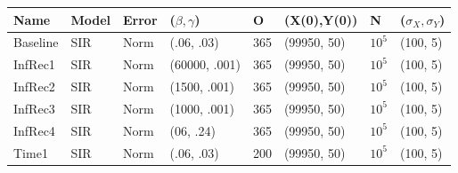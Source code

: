 \documentclass[12pt]{article}
\begin{document}
\begin{table}[]
\centering
\begin{tabular}{@{}llllllll@{}}
\toprule
\textbf{Name} & \textbf{Model} & \textbf{Error} & \textbf{($\beta, \gamma$)} & \textbf{O} & \textbf{(X(0),Y(0))} & \textbf{N} & \textbf{($\sigma_X, \sigma_Y$)} \\ \midrule
  Baseline        & SIR      &   Norm             & (.06, .03)                          &     365       &  (99950, 50)                    &  $10^5$          &(100, 5)                                \\ \midrule
  InfRec1       & SIR      &   Norm             & (60000, .001)                          &     365       &  (99950, 50)                    &  $10^5$          &(100, 5)\\
  InfRec2      & SIR      &   Norm             & (1500, .001)                          &     365       &  (99950, 50)                    &  $10^5$          &(100, 5)                                \\
  InfRec3      & SIR      &   Norm             & (1000, .001)                          &     365       &  (99950, 50)                    &  $10^5$          &(100, 5)                                \\
InfRec4      & SIR      &   Norm             & (06, .24)                          &     365       &  (99950, 50)                    &  $10^5$          &(100, 5)                                \\ \midrule
  Time1 & SIR &  Norm   & (.06, .03)                          &     200       &  (99950, 50)                    &  $10^5$          &(100, 5)                                \\

\end{tabular}
\end{table}
\end{document}
